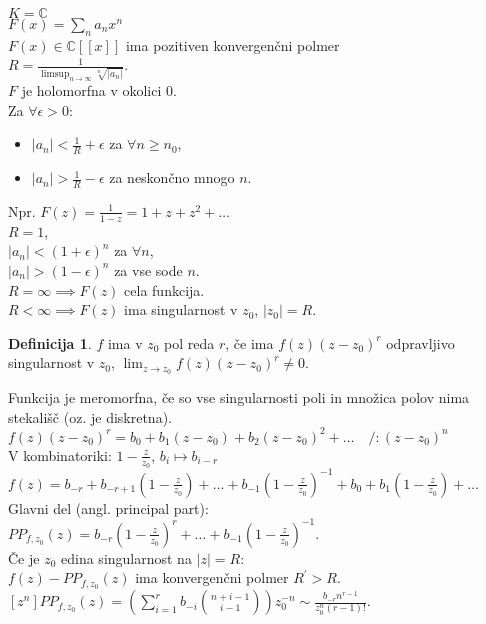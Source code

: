 \documentclass[a4paper, 12pt]{book}
\theoremstyle{definition}
\newtheorem{defn}[counter]{Definicija}
\theoremstyle{remark}
\newcommand{\C}{\mathbb{C}}
\begin{document}
$K = \C$ \\
$F(x) = \sum_n a_n x^n$ \\
$F(x) \in \C[[x]]$ ima pozitiven konvergenčni polmer \\
$R = \frac{1}{\limsup_{n \to \infty} \sqrt[n]{|a_n|}}$. \\
$F$ je holomorfna v okolici $0$. \\
Za $\forall \epsilon > 0$:
\begin{itemize}
  \item $|a_n| < \frac{1}{R} + \epsilon$ za $\forall n \geq n_0$,
  \item $|a_n| > \frac{1}{R} - \epsilon$ za neskončno mnogo $n$.
\end{itemize}
Npr. $F(z) = \frac{1}{1-z} = 1 + z + z^2 + \dots$ \\
$R = 1$, \\
$|a_n| < (1 + \epsilon)^n$ za $\forall n$, \\
$|a_n| > (1 - \epsilon)^n$ za vse sode $n$. \\
$R = \infty \implies F(z)$ cela funkcija. \\
$R < \infty \implies F(z)$ ima singularnost v $z_0$, $|z_0| = R$.
\begin{defn}
  $f$ ima v $z_0$ pol reda $r$, če ima $f(z) (z-z_0)^r$ odpravljivo singularnost v $z_0$,
  $\lim_{z \to z_0} f(z) (z-z_0)^r \neq 0$.
\end{defn}
Funkcija je meromorfna, če so vse singularnosti poli in množica polov nima stekališč (oz. je diskretna). \\
$f(z) (z-z_0)^r = b_0 + b_1(z-z_0) + b_2(z-z_0)^2 + \dots \quad /: (z-z_0)^n$ \\
V kombinatoriki: $1 - \frac{z}{z_0}$, $b_i \mapsto b_{i-r}$ \\
$f(z) = b_{-r} + b_{-r+1} \left(1-\frac{z}{z_0}\right) + \dots +
b_{-1} \left(1-\frac{z}{z_0}\right)^{-1} + b_0 + b_1 \left(1-\frac{z}{z_0}\right) + \dots$ \\
Glavni del (angl. principal part): \\
$PP_{f,z_0}(z) = b_{-r} \left(1-\frac{z}{z_0}\right)^r + \dots + b_{-1} \left(1-\frac{z}{z_0}\right)^{-1}$. \\
Če je $z_0$ edina singularnost na $|z| = R$: \\
$f(z) - PP_{f,z_0}(z)$ ima konvergenčni polmer $R^{'} > R$. \\
$[z^n] PP_{f,z_0}(z) = \left(\sum_{i=1}^{r} b_{-i} \binom{n+i-1}{i-1}\right) z_0^{-n} \sim
\frac{b_{-r} n^{r-1}}{z_0^n (r-1)!}$. \\
\end{document}
